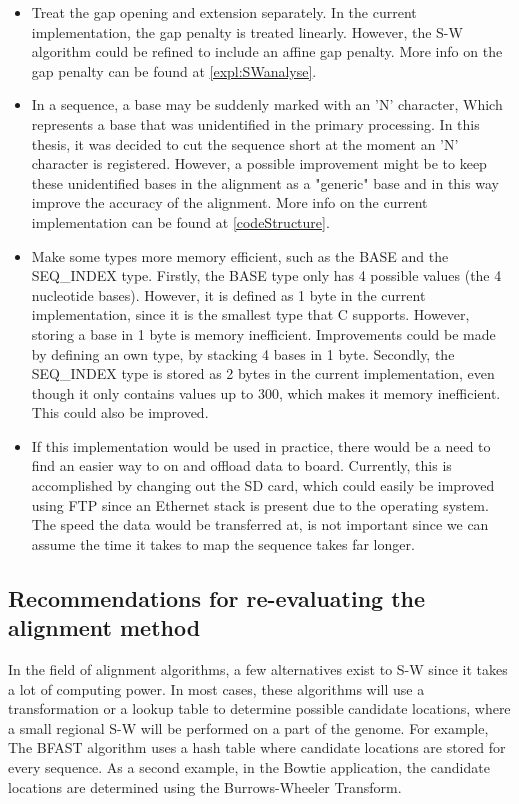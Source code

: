 \begin{itemize}
	\item Treat the gap opening and extension separately. In the current implementation, the gap penalty is treated linearly. However, the S-W algorithm could be refined to include an affine gap penalty. More info on the gap penalty can be found at \ref{expl:SWanalyse}.
	\item In a sequence, a base may be suddenly marked with an 'N' character, Which represents a base that was unidentified in the primary processing. In this thesis, it was decided to cut the sequence short at the moment an 'N' character is registered. However, a possible improvement might be to keep these unidentified bases in the alignment as a "generic" base and in this way improve the accuracy of the alignment. More info on the current implementation can be found at \ref{codeStructure}.
	\item Make some types more memory efficient, such as the BASE and the SEQ\_INDEX type. Firstly, the BASE type only has 4 possible values (the 4 nucleotide bases). However, it is defined as 1 byte in the current implementation, since it is the smallest type that C supports. However, storing a base in 1 byte is memory inefficient. Improvements could be made by defining an own type, by stacking 4 bases in 1 byte. Secondly, the SEQ\_INDEX type is stored as 2 bytes in the current implementation, even though it only contains values up to 300, which makes it memory inefficient. This could also be improved.
	\item If this implementation would be used in practice, there would be a need to find an easier way to on and offload data to board. Currently,  this is accomplished by changing out the SD card, which could easily be improved using FTP since an Ethernet stack is present due to the operating system. The speed the data would be transferred at, is not important since we can assume the time it takes to map the sequence takes far longer. 
\end{itemize}

\subsection{Recommendations for re-evaluating the alignment method}

In the field of alignment algorithms, a few alternatives exist to S-W since it takes a lot of computing power. In most cases, these algorithms will use a transformation or a lookup table to determine possible candidate locations, where a small regional S-W will be performed on a part of the genome. For example, The BFAST algorithm uses a hash table where candidate locations are stored for every sequence. As a second example, in the Bowtie application, the candidate locations are determined using the Burrows-Wheeler Transform.

